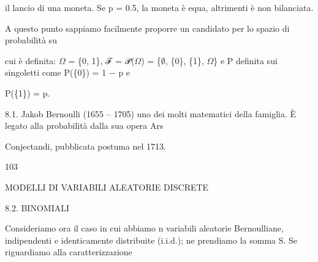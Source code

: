 \documentclass[a4paper,portrait,12pt]{article}
\begin{document}
\begin{flushleft}
il lancio di una moneta. Se p = 0.5, la moneta \`{e} equa, altrimenti \`{e} non bilanciata.
\end{flushleft}


\begin{flushleft}
A questo punto sappiamo facilmente proporre un candidato per lo spazio di probabilit\`{a} su
\end{flushleft}


\begin{flushleft}
cui \`{e} definita: $\Omega$ = \{0, 1\}, ℱ = 𝒫($\Omega$) = \{$\emptyset$, \{0\}, \{1\}, $\Omega$\} e P definita sui singoletti come P(\{0\}) = 1 $-$ p e
\end{flushleft}


\begin{flushleft}
P(\{1\}) = p.
\end{flushleft}


\begin{flushleft}
8.1. Jakob Bernoulli (1655 -- 1705) uno dei molti matematici della famiglia. \`{E} legato alla probabilit\`{a} dalla sua opera Ars
\end{flushleft}


\begin{flushleft}
Conjectandi, pubblicata postuma nel 1713.
\end{flushleft}





103










\begin{flushleft}
MODELLI DI VARIABILI ALEATORIE DISCRETE
\end{flushleft}





\begin{flushleft}
8.2. BINOMIALI
\end{flushleft}


\begin{flushleft}
Consideriamo ora il caso in cui abbiamo n variabili aleatorie Bernoulliane, indipendenti e identicamente distribuite (i.i.d.); ne prendiamo la somma S. Se riguardiamo alla caratterizzazione
\end{flushleft}
\end{document}
